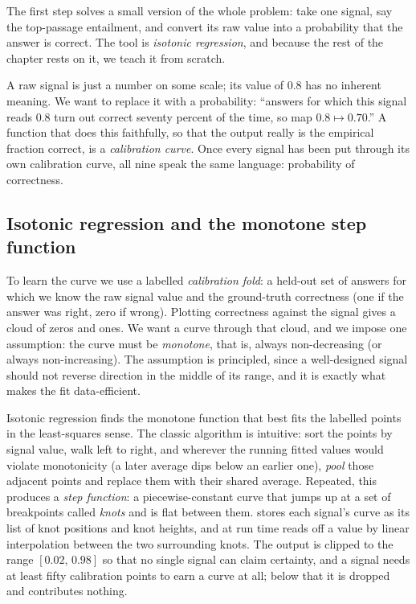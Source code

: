 The first step solves a small version of the whole problem: take one signal, say the
top-passage entailment, and convert its raw value into a probability that the answer
is correct. The tool is \emph{isotonic regression}, and because the rest of the
chapter rests on it, we teach it from scratch.

\begin{intuition}
A raw signal is just a number on some scale; its value of $0.8$ has no inherent
meaning. We want to replace it with a probability: ``answers for which this signal
reads $0.8$ turn out correct seventy percent of the time, so map $0.8 \mapsto 0.70$.''
A function that does this faithfully, so that the output really is the empirical
fraction correct, is a \emph{calibration curve}. Once every signal has been put
through its own calibration curve, all nine speak the same language: probability of
correctness.
\end{intuition}

\subsection*{Isotonic regression and the monotone step function}

To learn the curve we use a labelled \emph{calibration fold}: a held-out set of
answers for which we know the raw signal value and the ground-truth correctness (one
if the answer was right, zero if wrong). Plotting correctness against the signal
gives a cloud of zeros and ones. We want a curve through that cloud, and we impose
one assumption: the curve must be \emph{monotone}, that is, always non-decreasing (or
always non-increasing). The assumption is principled, since a well-designed signal
should not reverse direction in the middle of its range, and it is exactly what makes
the fit data-efficient.

\begin{precise}
Isotonic regression finds the monotone function that best fits the labelled points
in the least-squares sense. The classic algorithm is intuitive: sort the points by
signal value, walk left to right, and wherever the running fitted values would
violate monotonicity (a later average dips below an earlier one), \emph{pool} those
adjacent points and replace them with their shared average. Repeated, this produces a
\emph{step function}: a piecewise-constant curve that jumps up at a set of breakpoints
called \emph{knots} and is flat between them. \caem{} stores each signal's curve as
its list of knot positions and knot heights, and at run time reads off a value by
linear interpolation between the two surrounding knots. The output is clipped to the
range $[0.02,\,0.98]$ so that no single signal can claim certainty, and a signal needs
at least fifty calibration points to earn a curve at all; below that it is dropped and
contributes nothing.
\end{precise}

